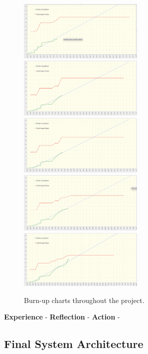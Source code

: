   \begin{figure}[H]
    \centering
    \includegraphics[width=6cm]{assets/outputs/burnups/01-16.png}
    \includegraphics[width=6cm]{assets/outputs/burnups/01-30.png}
    \includegraphics[width=6cm]{assets/outputs/burnups/02-05.png}
    \includegraphics[width=6cm]{assets/outputs/burnups/02-14.png}
    \includegraphics[width=6cm]{assets/outputs/burnups/02-27.png}
    \caption{Burn-up charts throughout the project.}
    \label{fig:burnups}
  \end{figure}

  \textbf{Experience} -
  \textbf{Reflection} -
  \textbf{Action} -

  \newpage
  \subsection{Final System Architecture}


